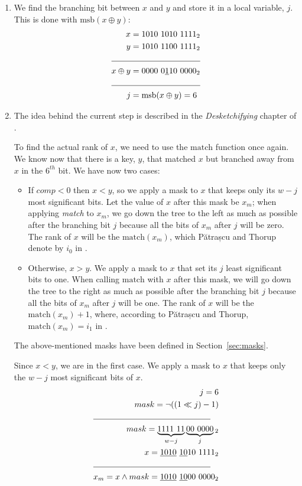 \begin{enumerate}
    \item
    We find the branching bit between $x$ and $y$ and store it in a local variable, $j$. This is done with $\text{msb}(x \oplus y)$:
    \begin{align*}
        x &= 1010\ 1010\ 1111_2\\
        y &= 1010\ 1100\ 1111_2\\
        \cline{1-2}
        x \oplus y &= 0000\ 0\underline{1}10\ 0000_2\\
        \cline{1-2}
        j &= \text{msb}(x \oplus y) = 6
    \end{align*}
    
    \item
    The idea behind the current step is described in the \textit{Desketchifying} chapter of \cite{erikdemainelec12}.
    
    To find the actual rank of $x$, we need to use the $\text{match}$ function once again. We know now that there is a key, $y$, that matched $x$ but branched away from $x$ in the $6^{th}$ bit.
    We have now two cases:
    \begin{itemize}
        \item
        If $comp < 0$ then $x < y$, so we apply a mask to $x$ that keeps only its $w-j$ most significant bits. Let the value of $x$ after this mask be $x_m$; when applying \textit{match} to $x_m$, we go down the tree to the left as much as possible after the branching bit $j$ because all the bits of $x_m$ after $j$ will be zero. The rank of $x$ will be the $\text{match}(x_m)$, which Pătrașcu and Thorup denote by $i_0$ in \cite{patrascu2014dynamic}.
        
        \item
        Otherwise, $x > y$. We apply a mask to $x$ that set its $j$ least significant bits to one. When calling $\text{match}$ with $x$ after this mask, we will go down the tree to the right as much as possible after the branching bit $j$ because all the bits of $x_m$ after $j$ will be one. The rank of $x$ will be the $\text{match}(x_m) + 1$, where, according to Pătrașcu and Thorup, $\text{match}(x_m) = i_1$ in \cite{patrascu2014dynamic}.
    \end{itemize}
    The above-mentioned masks have been defined in Section~\ref{sec:masks}.
    
    Since $x < y$, we are in the first case. We apply a mask to $x$ that keeps only the $w-j$ most significant bits of $x$. 
    \begin{align*}
        j = 6\\
        mask = \neg((1 \ll j) - 1)\\
        \cline{1-2}
        mask = \underbrace{1111\ 11}_{w-j}\underbrace{00\ 0000}_j{}_2\\
        x = \underline{1010}\ \underline{10}10\ 1111_2\\
        \cline{1-2}
        x_m = x \wedge mask = \underline{1010}\ \underline{10}00\ 0000_2
    \end{align*}


\end{enumerate}
